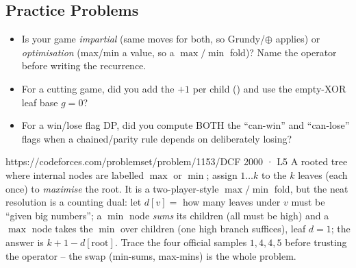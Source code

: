 \subsection{Practice Problems}

\begin{stuckbox}
\begin{itemize}[nosep, leftmargin=1.4em]
  \item Is your game \emph{impartial} (same moves for both, so Grundy/$\oplus$ applies) or
        \emph{optimisation} (max/min a value, so a $\max/\min$ fold)? Name the operator
        before writing the recurrence.
  \item For a cutting game, did you add the $+1$ per child () and
        use the empty-XOR leaf base $g=0$?
  \item For a win/lose flag DP, did you compute BOTH the ``can-win'' and ``can-lose''
        flags when a chained/parity rule depends on deliberately losing?
\end{itemize}
\end{stuckbox}

\begin{practiceset}
    {https://codeforces.com/problemset/problem/1153/D}{CF 2000 · L5}
    {A rooted tree where internal nodes are labelled $\max$ or $\min$; assign $1 \dots k$
    to the $k$ leaves (each once) to \emph{maximise} the root. It is a two-player-style
    $\max/\min$ fold, but the neat resolution is a counting dual: let $d[v] = $ how many
    leaves under $v$ must be ``given big numbers''; a $\min$ node \emph{sums} its children
    (all must be high) and a $\max$ node takes the $\min$ over children (one high branch
    suffices), leaf $d = 1$; the answer is $k + 1 - d[\text{root}]$. Trace the four
    official samples $1, 4, 4, 5$ before trusting the operator -- the swap (min-sums,
    max-mins) is the whole problem.}\end{practiceset}

